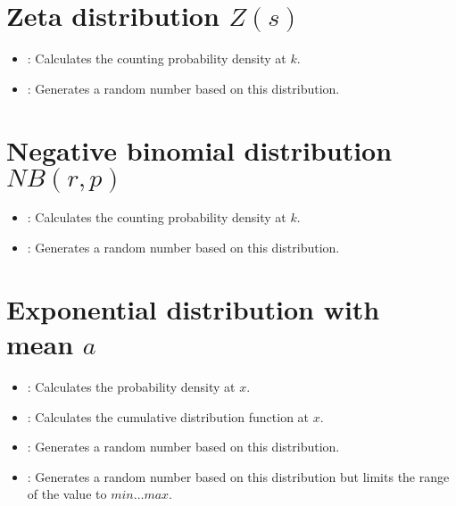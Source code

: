 \section{Zeta distribution \texorpdfstring{$Z(s)$}{Z(s)}}

\begin{itemize}

\item
{}:
Calculates the counting probability density at $k$.

\item
{}:
Generates a random number based on this distribution.

\end{itemize}



\section{Negative binomial distribution \texorpdfstring{$NB(r,p)$}{NB(r,p)}}

\begin{itemize}

\item
{}:
Calculates the counting probability density at $k$.

\item
{}:
Generates a random number based on this distribution.

\end{itemize}



\section{Exponential distribution with mean \texorpdfstring{$a$}{a}}

\begin{itemize}

\item
{}:
Calculates the probability density at $x$.

\item
{}:
Calculates the cumulative distribution function at $x$.

\item
{}:
Generates a random number based on this distribution.

\item
{}:
Generates a random number based on this distribution but limits the range of the value to $min\ldots max$.

\end{itemize}



